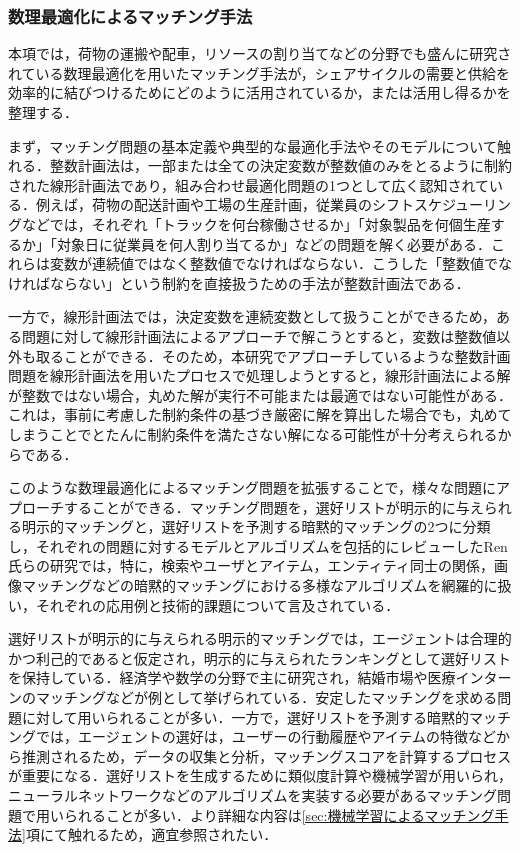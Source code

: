       \subsubsection{数理最適化によるマッチング手法}
        \label{sec:数理最適化によるマッチング手法}
          \par 本項では，荷物の運搬や配車，リソースの割り当てなどの分野でも盛んに研究されている数理最適化を用いたマッチング手法が，シェアサイクルの需要と供給を効率的に結びつけるためにどのように活用されているか，または活用し得るかを整理する．
          \par まず，マッチング問題の基本定義や典型的な最適化手法やそのモデルについて触れる．整数計画法は，一部または全ての決定変数が整数値のみをとるように制約された線形計画法であり，組み合わせ最適化問題の1つとして広く認知されている．例えば，荷物の配送計画や工場の生産計画，従業員のシフトスケジューリングなどでは，それぞれ「トラックを何台稼働させるか」「対象製品を何個生産するか」「対象日に従業員を何人割り当てるか」などの問題を解く必要がある．これらは変数が連続値ではなく整数値でなければならない．こうした「整数値でなければならない」という制約を直接扱うための手法が整数計画法である．
          \par 一方で，線形計画法では，決定変数を連続変数として扱うことができるため，ある問題に対して線形計画法によるアプローチで解こうとすると，変数は整数値以外も取ることができる．そのため，本研究でアプローチしているような整数計画問題を線形計画法を用いたプロセスで処理しようとすると，線形計画法による解が整数ではない場合，丸めた解が実行不可能または最適ではない可能性がある．これは，事前に考慮した制約条件の基づき厳密に解を算出した場合でも，丸めてしまうことでとたんに制約条件を満たさない解になる可能性が十分考えられるからである．
          \par このような数理最適化によるマッチング問題を拡張することで，様々な問題にアプローチすることができる．マッチング問題を，選好リストが明示的に与えられる明示的マッチングと，選好リストを予測する暗黙的マッチングの2つに分類し，それぞれの問題に対するモデルとアルゴリズムを包括的にレビューしたRen氏らの研究では，特に，検索やユーザとアイテム，エンティティ同士の関係，画像マッチングなどの暗黙的マッチングにおける多様なアルゴリズムを網羅的に扱い，それぞれの応用例と技術的課題について言及されている．
          \par 選好リストが明示的に与えられる明示的マッチングでは，エージェントは合理的かつ利己的であると仮定され，明示的に与えられたランキングとして選好リストを保持している．経済学や数学の分野で主に研究され，結婚市場や医療インターンのマッチングなどが例として挙げられている．安定したマッチングを求める問題に対して用いられることが多い．一方で，選好リストを予測する暗黙的マッチングでは，エージェントの選好は，ユーザーの行動履歴やアイテムの特徴などから推測されるため，データの収集と分析，マッチングスコアを計算するプロセスが重要になる．選好リストを生成するために類似度計算や機械学習が用いられ，ニューラルネットワークなどのアルゴリズムを実装する必要があるマッチング問題で用いられることが多い．より詳細な内容は\ref{sec:機械学習によるマッチング手法}項にて触れるため，適宜参照されたい．
